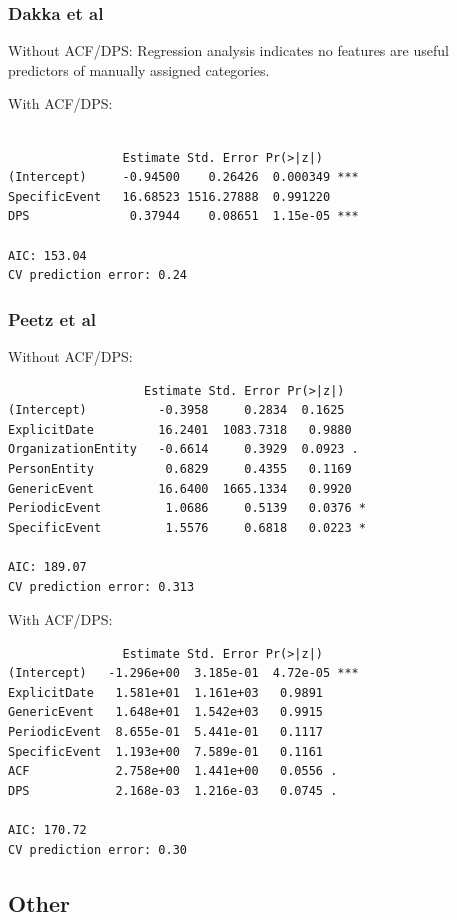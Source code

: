 \documentclass{sig-alternate}
\begin{document}
\subsubsection{Dakka et al}

Without ACF/DPS: Regression analysis indicates no features are useful predictors of manually assigned categories.


With ACF/DPS:
\begin{verbatim}

                Estimate Std. Error Pr(>|z|)    
(Intercept)     -0.94500    0.26426  0.000349 ***
SpecificEvent   16.68523 1516.27888  0.991220    
DPS              0.37944    0.08651  1.15e-05 ***

AIC: 153.04
CV prediction error: 0.24
\end{verbatim}

\subsubsection{Peetz et al}


Without ACF/DPS:
\begin{verbatim}
                   Estimate Std. Error Pr(>|z|)  
(Intercept)          -0.3958     0.2834  0.1625  
ExplicitDate         16.2401  1083.7318   0.9880  
OrganizationEntity   -0.6614     0.3929  0.0923 .
PersonEntity          0.6829     0.4355   0.1169  
GenericEvent         16.6400  1665.1334   0.9920  
PeriodicEvent         1.0686     0.5139   0.0376 *
SpecificEvent         1.5576     0.6818   0.0223 *

AIC: 189.07
CV prediction error: 0.313
\end{verbatim}

With ACF/DPS:
\begin{verbatim}
                Estimate Std. Error Pr(>|z|)    
(Intercept)   -1.296e+00  3.185e-01  4.72e-05 ***
ExplicitDate   1.581e+01  1.161e+03   0.9891    
GenericEvent   1.648e+01  1.542e+03   0.9915    
PeriodicEvent  8.655e-01  5.441e-01   0.1117    
SpecificEvent  1.193e+00  7.589e-01   0.1161    
ACF            2.758e+00  1.441e+00   0.0556 .  
DPS            2.168e-03  1.216e-03   0.0745 . 

AIC: 170.72
CV prediction error: 0.30
\end{verbatim}

\subsection{Other}
\end{document}
